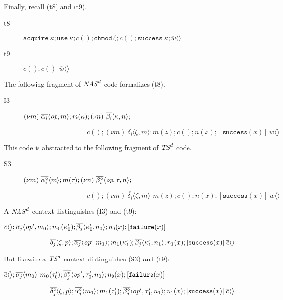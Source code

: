 \documentclass[10pt]{article}
\newcommand{\op}{{\it op}}
\newcommand{\tup}[1]{\langle #1\rangle}
\newcommand{\pause}{;}
\newcommand{\betac}{\beta^\circ}
\newcommand{\alphac}{\alpha^\circ}
\newcommand{\deltac}{\delta^\circ}
\begin{document}
Finally, recall (t8) and (t9).
\begin{description}
\item[t8] $\mathtt{acquire}\:\kappa; \mathtt{use}\:\kappa; c(); \mathtt{chmod}\:\zeta; c(); \mathtt{success}\:\kappa; \overline w\tup{}$
\item[t9] $c(); c(); \overline w\tup{}$
\end{description}
The following fragment of ${\it NAS}^d$ code formalizes (t8).
\begin{description}
\item[I3] $(\nu m)~\overline{\alpha_i}\tup{\op,m}\pause m(\kappa)\pause (\nu n)~\overline{\beta_i}\tup{\kappa,n}\pause $
\par $~~~~~~~~~~~~~~~~~~~~~~~~~~~~~~~~~~~~~~~~~~c() \pause (\nu m)~\overline{\delta_i}\tup{\zeta,m}\pause m(z)\pause c()\pause n(x)\pause [\mathtt{success}(x)]~\overline w\tup{}$
\end{description}
This code is abstracted to the following fragment of ${\it TS}^d$ code.
\begin{description}
\item[S3] $(\nu m)~\overline{\alphac_i}\tup{m}\pause m(\tau)\pause (\nu n)~\overline{\betac_i}\tup{\op,\tau,n}\pause $
\par $~~~~~~~~~~~~~~~~~~~~~~~~~~~~~~~~~~~~~~~~~~c() \pause (\nu m)~\overline{\deltac_i}\tup{\zeta,m}\pause m(z)\pause c()\pause n(x)\pause [\mathtt{success}(x)]~\overline w\tup{}$
\end{description}
A ${\it NAS}^d$ context distinguishes (I3) and (t9):
\begin{description}
\item $\overline c\tup{}; \overline{\alpha_j}\tup{\op',m_0}\pause m_0(\kappa'_0)\pause \overline{\beta_j}\tup{\kappa'_0,n_0}\pause n_0(x)\pause [\mathtt{failure}(x)]$
\par $~~~~~~~~~~~~~~~~~~~~\overline{\delta_j}\tup{\zeta,p}\pause  \overline{\alpha_j}\tup{\op',m_1}\pause m_1(\kappa'_1)\pause \overline{\beta_j}\tup{\kappa'_1,n_1}\pause n_1(x)\pause [\mathtt{success}(x)]~\overline c\tup{}$
\end{description}
But likewise a ${\it TS}^d$ context distinguishes (S3) and (t9):
\begin{description}
\item $\overline c\tup{}; \overline{\alpha_j}\tup{m_0}\pause m_0(\tau'_0)\pause \overline{\betac_j}\tup{\op',\tau'_0,n_0}\pause n_0(x)\pause [\mathtt{failure}(x)]$
\par $~~~~~~~~~~~~~~~~~~~~\overline{\deltac_j}\tup{\zeta,p}\pause  \overline{\alphac_j}\tup{m_1}\pause m_1(\tau'_1)\pause \overline{\betac_j}\tup{\op',\tau'_1,n_1}\pause n_1(x)\pause [\mathtt{success}(x)]~\overline c\tup{}$
\end{description}
\end{document}
